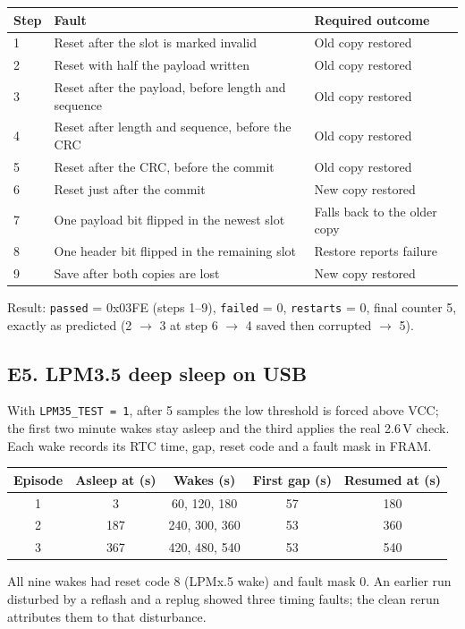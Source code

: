 \documentclass[conference]{IEEEtran}
\newcommand{\code}[1]{\texttt{#1}}
\begin{document}
\begin{table}[H]
\centering\small
\begin{tabularx}{\textwidth}{@{}lLl@{}}
\toprule
Step & Fault & Required outcome \\
 & Reset after the slot is marked invalid & Old copy restored \\
2 & Reset with half the payload written & Old copy restored \\
3 & Reset after the payload, before length and sequence & Old copy restored \\
4 & Reset after length and sequence, before the CRC & Old copy restored \\
5 & Reset after the CRC, before the commit & Old copy restored \\
6 & Reset just after the commit & New copy restored \\
7 & One payload bit flipped in the newest slot & Falls back to the older copy \\
8 & One header bit flipped in the remaining slot & Restore reports failure \\
9 & Save after both copies are lost & New copy restored \\
\bottomrule
\end{tabularx}
\end{table}
\noindent Result: \code{passed} = 0x03FE (steps 1--9), \code{failed} = 0, \code{restarts} = 0, final counter 5, exactly as predicted (2 $\rightarrow$ 3 at step 6 $\rightarrow$ 4 saved then corrupted $\rightarrow$ 5).

\subsection*{E5. LPM3.5 deep sleep on USB}
With \code{LPM35\_TEST = 1}, after 5 samples the low threshold is forced above VCC; the first two minute wakes stay asleep and the third applies the real 2.6\,V check. Each wake records its RTC time, gap, reset code and a fault mask in FRAM.

\begin{table}[H]
\centering\small
\begin{tabular}{@{}ccccc@{}}
\toprule
Episode & Asleep at (s) & Wakes (s) & First gap (s) & Resumed at (s) \\
\midrule
1 & 3 & 60, 120, 180 & 57 & 180 \\
2 & 187 & 240, 300, 360 & 53 & 360 \\
3 & 367 & 420, 480, 540 & 53 & 540 \\
\bottomrule
\end{tabular}
\end{table}
\noindent All nine wakes had reset code 8 (LPMx.5 wake) and fault mask 0. An earlier run disturbed by a reflash and a replug showed three timing faults; the clean rerun attributes them to that disturbance.
\end{document}
